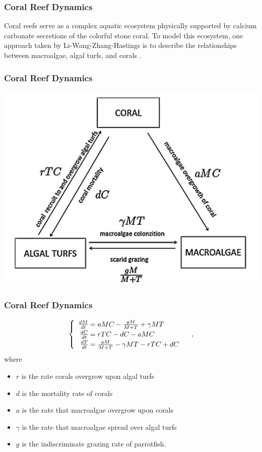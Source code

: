 \begin{frame}
\frametitle{Coral Reef Dynamics}
\hspace{1.5em}Coral reefs serve as a complex aquatic ecosystem physically supported by calcium carbonate secretions of the colorful stone coral. To model this ecosystem, one approach taken by Li-Wang-Zhang-Hastings is to describe the relationships between macroalgae, algal turfs, and corals \cite{Hastings}.
\end{frame}

\begin{frame}
\frametitle{Coral Reef Dynamics}
\includegraphics[natwidth=162bp,natheight=227bp,width=280bp]{./coral-reef-triangle.png}
\end{frame}
\begin{frame}\frametitle{Coral Reef Dynamics}
$$\begin{cases}\begin{array}{rl}
\frac{dM}{dt}\hspace{-.8em}&=aMC - \frac{gM}{M+T}+\gamma M T\\
\frac{dC}{dt}\hspace{-.8em}&=rTC - dC - aMC\\
\frac{dT}{dt}\hspace{-.8em}&=\frac{gM}{M + T} - \gamma MT - rTC + dC
\end{array}\end{cases},$$ where \begin{itemize}\itemsep0pt
\item $r$ is the rate corals overgrow upon algal turfs\\
\item $d$ is the mortality rate of corals\\
\item $a$ is the rate that macroalgae overgrow upon corals\\
\item $\gamma$ is the rate that macroalgae spread over algal turfs\\
\item $g$ is the indiscriminate grazing rate of parrotfish.
\end{itemize}
\end{frame}

